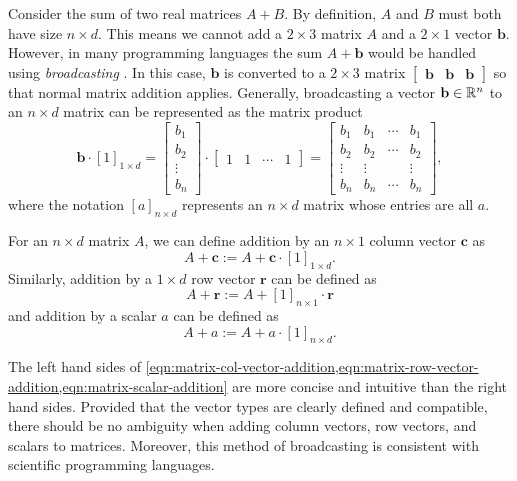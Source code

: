 \def\b{\mathbf{b}}
Consider the sum of two real matrices \(A + B\).
By definition, \(A\) and \(B\) must both have size \(n \times d\).
This means we cannot add a \(2 \times 3\) matrix \(A\) and a \(2 \times 1\) vector \(\b\).
However, in many programming languages the sum \(A + \b\) would be handled using \textit{broadcasting} \cite{harris2020array}.
In this case, \(\b\) is converted to a \(2 \times 3\) matrix \(\begin{bmatrix} \b & \b & \b \end{bmatrix}\) so that normal matrix addition applies.
Generally, broadcasting a vector \(\b \in \RR^n\) to an \(n \times d\) matrix can be represented as the matrix product
\begin{equation}
    \label{eqn:vector-broadcasting}
    \b \cdot [1]_{1 \times d}
    = \begin{bmatrix}
        b_1 \\ b_2 \\ \vdots \\ b_n
    \end{bmatrix}
    \cdot
    \begin{bmatrix}
        1 & 1 & \cdots & 1
    \end{bmatrix}
    = \begin{bmatrix}
        b_1 & b_1 & \cdots & b_1 \\
        b_2 & b_2 & \cdots & b_2 \\
        \vdots & \vdots & & \vdots \\
        b_n & b_n & \cdots & b_n
    \end{bmatrix},
\end{equation}
where the notation \([a]_{n \times d}\) represents an \(n \times d\) matrix whose entries are all \(a\).
\begin{definition}
    \label{def:broadcast-addition}
    For an \(n \times d\) matrix \(A\), we can define addition by an \(n \times 1\) column vector \(\mathbf{c}\) as
    \begin{equation}
        \label{eqn:matrix-col-vector-addition}
        A + \mathbf{c} := A + \mathbf{c} \cdot [1]_{1 \times d}.
    \end{equation}
    Similarly, addition by a \(1 \times d\) row vector \(\mathbf{r}\) can be defined as
    \begin{equation}
        \label{eqn:matrix-row-vector-addition}
        A + \mathbf{r} := A + [1]_{n \times 1} \cdot \mathbf{r}
    \end{equation}
    and addition by a scalar \(a\) can be defined as
    \begin{equation}
        \label{eqn:matrix-scalar-addition}
        A + a := A + a \cdot [1]_{n \times d}.
    \end{equation}
\end{definition}

The left hand sides of \cref{eqn:matrix-col-vector-addition,eqn:matrix-row-vector-addition,eqn:matrix-scalar-addition} are more concise and intuitive than the right hand sides.
Provided that the vector types are clearly defined and compatible, there should be no ambiguity when adding column vectors, row vectors, and scalars to matrices.
Moreover, this method of broadcasting is consistent with scientific programming languages.